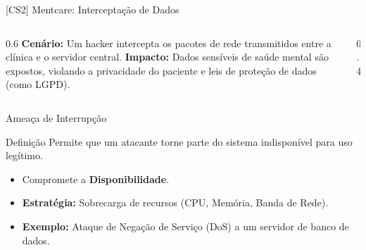 \documentclass[aspectratio=169]{beamer}
\begin{document}
\begin{frame}{[CS2] Mentcare: Interceptação de Dados}
    \begin{columns}
        \begin{column}{0.6\textwidth}
            \textbf{Cenário:} Um hacker intercepta os pacotes de rede transmitidos entre a clínica e o servidor central.
            \vspace{0.3cm}
            \textbf{Impacto:} Dados sensíveis de saúde mental são expostos, violando a privacidade do paciente e leis de proteção de dados (como LGPD).
        \end{column}
        \begin{column}{0.4\textwidth}
            \centering
        \end{column}
    \end{columns}
\end{frame}

\begin{frame}{Ameaça de Interrupção}
    \begin{block}{Definição}
        Permite que um atacante torne parte do sistema indisponível para uso legítimo.
    \end{block}
    \begin{itemize}
        \item Compromete a \textbf{Disponibilidade}.
        \item \textbf{Estratégia:} Sobrecarga de recursos (CPU, Memória, Banda de Rede).
        \item \textbf{Exemplo:} Ataque de Negação de Serviço (DoS) a um servidor de banco de dados.
    \end{itemize}
\end{frame}
\end{document}
